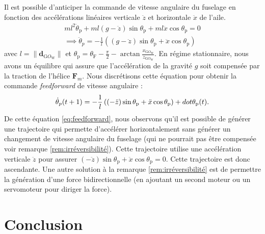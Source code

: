 \newpage
Il est possible d'anticiper la commande de vitesse angulaire du fuselage en fonction des accélérations linéaires verticale $\ddot{z}$ et horizontale $\ddot{x}$ de l'aile.
\begin{align}
    \label{eq:dynamiquependule}
    m l^{2} \ddot{\theta}_{\text{p}} + ml(g-\ddot{z}) \sin{\theta_{\text{p}}} + ml \ddot{x} \cos{\theta_{\text{p}}} = 0\\
    \implies \ddot{\theta}_{p} = -\frac{1}{l} \left( (g-\ddot{z})\sin{\theta_{\text{p}}} + \ddot{x} \cos{\theta_{\text{p}}} \right)
\end{align}
avec $l = \| \boldsymbol{d}_{\text{G}O_{\text{W}}} \|$ et $\theta_{\text{p}} = \theta_{\text{F}} - \frac{\pi}{2} - \arctan{\frac{{x}_{\text{G}O_{\text{W}}}}{{z}_{\text{G}O_{\text{W}}}}}$.
En régime stationnaire, nous avons un équilibre qui assure que l'accélération de la gravité $g$ soit compensée par la traction de l'hélice $\boldsymbol{F}_{m}$. Nous discrétisons cette équation pour obtenir la commande \textit{feedforward} de vitesse angulaire : 
\begin{align}
    \label{eq:feedforward}
    \dot{\theta}_{p} (t+1) = -\frac{1}{l} \left( (-\ddot{z})\sin{\theta_{\text{\text{p}}}} + \ddot{x} \cos{\theta_{\text{p}}} \right) + dot{\theta}_{\text{p}} (t).
\end{align}
De cette équation \eqref{eq:feedforward}, nous observons qu'il est possible de générer une trajectoire qui permette d'accélérer horizontalement sans générer un changement de vitesse angulaire du fuselage (qui ne pourrait pas être compensée voir remarque \ref{rem:irréversibilité}). Cette trajectoire utilise une accélération verticale $\ddot{z}$ pour assurer $ (-\ddot{z})\sin{\theta_{\text{p}}} + \ddot{x} \cos{\theta_{\text{p}}} = 0 $. Cette trajectoire est donc ascendante. Une autre solution à la remarque \ref{rem:irréversibilité} est de permettre la génération d'une force bidirectionnelle (en ajoutant un second moteur ou un servomoteur pour diriger la force).







\section{Conclusion}

